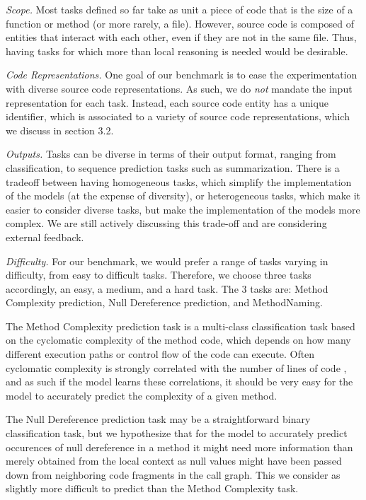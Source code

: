 \documentclass[sigplan,review,anonymous]{acmart}\settopmatter{printfolios=true,printccs=false,printacmref=false}
\begin{document}
\textit{Scope.} Most tasks defined so far take as unit a piece of code that is the size of a function or method (or more rarely, a file). However, source code is composed of entities that interact with each other, even if they are not in the same file. Thus, having tasks for which more than local reasoning is needed would be desirable.

\textit{Code Representations.} One goal of our benchmark is to ease the experimentation with diverse source code representations. As such, we do \emph{not} mandate the input representation for each task. Instead, each source code entity has a unique identifier, which is associated to a variety of source code representations, which we discuss in section 3.2.

\textit{Outputs.} Tasks can be diverse in terms of their output format, ranging from classification, to sequence prediction tasks such as summarization. There is a tradeoff between having homogeneous tasks, which simplify the implementation of the models (at the expense of diversity), or heterogeneous tasks, which make it easier to consider diverse tasks, but make the implementation of the models more complex. We are still actively discussing this trade-off and are considering external feedback.

\textit{Difficulty.} 
For our benchmark, we would prefer a range of tasks varying in difficulty, from easy to difficult tasks. Therefore, we choose three tasks accordingly, an easy, a medium, and a hard task. The 3 tasks are: Method Complexity prediction, Null Dereference prediction, and MethodNaming. 

The Method Complexity prediction task is a multi-class classification task based on the cyclomatic complexity of the method code, which depends on how many different execution paths or control flow of the code can execute. Often cyclomatic complexity is strongly correlated with the number of lines of code \cite{cyclvsloc}, and as such if the model learns these correlations, it should be very easy for the model to accurately predict the complexity of a given method. 

The Null Dereference prediction task may be a straightforward binary classification task, but we hypothesize that for the model to accurately predict occurences of null dereference in a method it might need more information than merely obtained from the local context as null values might have been passed down from neighboring code fragments in the call graph. This we consider as slightly more difficult to predict than the Method Complexity task. 
\end{document}
